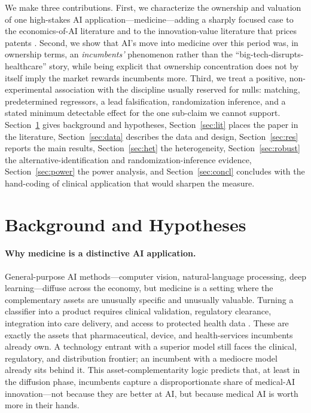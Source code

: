 \documentclass[12pt]{article}
\begin{document}
We make three contributions. First, we characterize the ownership and valuation of one
high-stakes AI application---medicine---adding a sharply focused case to the economics-of-AI
literature \citep{cockburn2018,agrawal2019,babina2024,eisfeldt2023,webb2020,bianchini2022} and to
the innovation-value literature that prices patents \citep{kpss2017,hall2005,hirshleifer2013,
peters2017}. Second, we show that AI's move into medicine over this period was, in ownership terms,
an \emph{incumbents'} phenomenon rather than the ``big-tech-disrupts-healthcare'' story, while
being explicit that ownership concentration does not by itself imply the market rewards incumbents
more. Third, we treat a positive, non-experimental association with the discipline usually reserved
for nulls: matching, predetermined regressors, a lead falsification, randomization inference, and a
stated minimum detectable effect for the one sub-claim we cannot support. Section~\ref{sec:bg}
gives background and hypotheses, Section~\ref{sec:lit} places the paper in the literature,
Section~\ref{sec:data} describes the data and design, Section~\ref{sec:res} reports the main
results, Section~\ref{sec:het} the heterogeneity, Section~\ref{sec:robust} the
alternative-identification and randomization-inference evidence, Section~\ref{sec:power} the power
analysis, and Section~\ref{sec:concl} concludes with the hand-coding of clinical application that
would sharpen the measure.

\section{Background and Hypotheses}\label{sec:bg}
\paragraph{Why medicine is a distinctive AI application.} General-purpose AI methods---computer
vision, natural-language processing, deep learning---diffuse across the economy, but medicine is a
setting where the complementary assets are unusually specific and unusually valuable. Turning a
classifier into a product requires clinical validation, regulatory clearance, integration into
care delivery, and access to protected health data \citep{topol2019,rajkomar2019}. These are
exactly the assets that pharmaceutical, device, and health-services incumbents already own. A
technology entrant with a superior model still faces the clinical, regulatory, and distribution
frontier; an incumbent with a mediocre model already sits behind it. This asset-complementarity
logic predicts that, at least in the diffusion phase, incumbents capture a disproportionate share
of medical-AI innovation---not because they are better at AI, but because medical AI is worth more
in their hands.
\end{document}
